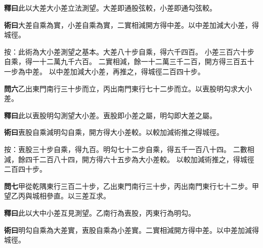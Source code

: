 \documentclass[12pt,a4paper]{article}
\begin{document}
\vspace{0.3em}

\noindent\textbf{釋曰}\quad 此以大差大小差立法測望。大差即通股弦較，小差即通勾弦較。

\vspace{0.3em}

\noindent\textbf{術曰}\quad 大差自乘為實，小差自乘為實，二實相減開方得中差。以中差加減大小差，得城徑。

\vspace{0.3em}

\noindent
按：此術為大小差測望之基本。大差八十步自乘，得六千四百。
小差三百六十步自乘，得一十二萬九千六百。
二實相減，餘一十二萬三千二百，開方得三百五十一步為中差。
以中差加減大小差，再推之，得城徑二百四十步。

\vspace{0.5em}

\noindent\textbf{問六}\quad 乙出東門南行三十步而立，丙出南門東行七十二步而立。以叀股明勾求大小差。

\vspace{0.3em}

\noindent\textbf{釋曰}\quad 此以叀股明勾測望大小差。叀股即小差之屬，明勾即大差之屬。

\vspace{0.3em}

\noindent\textbf{術曰}\quad 叀股自乘減明勾自乘，開方得大小差較。以較加減術推之得城徑。

\vspace{0.3em}

\noindent
按：叀股三十步自乘，得九百。明勾七十二步自乘，得五千一百八十四。
二數相減，餘四千二百八十四，開方得六十五步為大小差較。
以較加減術推之，得城徑二百四十步。

\vspace{0.5em}

\noindent\textbf{問七}\quad 甲從乾隅東行三百二十步，乙出東門南行三十步，丙出南門東行七十二步。甲望乙丙與城相參直。以三差互求。

\vspace{0.3em}

\noindent\textbf{釋曰}\quad 此以大中小差互見測望。乙南行為叀股，丙東行為明勾。

\vspace{0.3em}

\noindent\textbf{術曰}\quad 明勾自乘為大差實，叀股自乘為小差實。二實相減開方得中差。以中差加減得城徑。

\vspace{0.5em}
\end{document}
